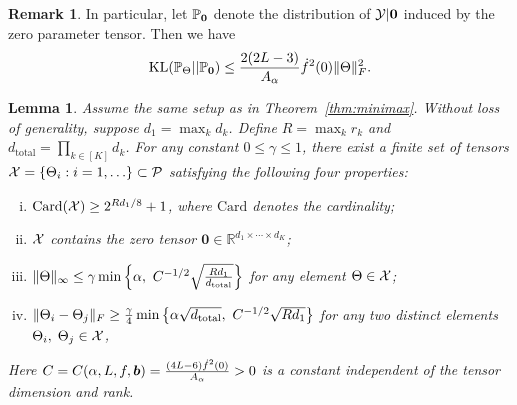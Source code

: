 \documentclass[11pt]{article}
\theoremstyle{plain}
\newtheorem{lem}{Lemma}
\theoremstyle{definition}
\newtheorem{rmk}{Remark}
\begin{document}
\begin{rmk} In particular, let $\mathbb{P}_{\bf{0}}$ denote the distribution of $\mathcal{Y}|\bf{0}$ induced by the zero parameter tensor. Then we have
\[
\text{KL}(\mathbb{P}_{\Theta}||\mathbb{P}_{\bf{0}})\leq {2(2L-3)\over A_\alpha}  \dot{f}^2(0)\lVert\Theta\rVert_F^2.
\]
\end{rmk}


\begin{lem}\label{lem:construction}
Assume the same setup as in Theorem~\ref{thm:minimax}. Without loss of generality, suppose $d_1=\max_kd_k$. Define $R=\max_k r_k$ and $d_{\text{total}}=\prod_{k\in[K]} d_k$. For any constant $0\leq \gamma \leq 1$, there exist a finite set of tensors $\mathcal{X}=\{\Theta_i: i=1,\ldots\}\subset \mathcal{P}$ satisfying the following four properties:
\begin{enumerate}[(i)]
\item $\text{Card}(\mathcal{X})\geq 2^{Rd_1/8}+1$, where $\text{Card}$ denotes the cardinality;
\item $\mathcal{X}$ contains the zero tensor $\mathbf{0}\in\mathbb{R}^{d_1\times \cdots\times d_K}$;
\item $\lVert\Theta\rVert_\infty\leq \gamma \min\left\{ \alpha ,\ C^{-1/2}\sqrt{Rd_1\over d_{\text{total}}} \right\} $ for any element $\Theta\in\mathcal{X}$;
\item $\FnormSize{}{\Theta_i-\Theta_j}\geq {\gamma\over 4} \min\left\{ \alpha\sqrt{d_{\text{total}}},\ C^{-1/2}\sqrt{Rd_1}\right\}$ for any two distinct elements $\Theta_i,\; \Theta_j\in\mathcal{X}$,
\end{enumerate}
Here $C=C(\alpha,L,f,\bm{b})={(4L-6)\dot{f}^2(0)\over A_\alpha }>0$ is a constant independent of the tensor dimension and rank.
\end{lem}
\end{document}
